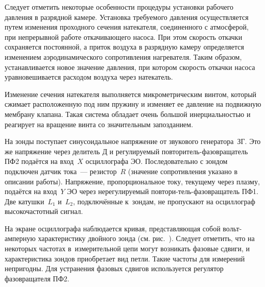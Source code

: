 Следует отметить некоторые особенности процедуры установки рабочего давления в
разрядной камере. Установка требуемого давления осуществляется путем изменения
проходного сечения натекателя, соединенного с атмосферой, при непрерывной работе
откачивающего насоса. При этом скорость откачки сохраняется постоянной, а приток
воздуха в разрядную камеру определяется изменением аэродинамического
сопротивления нагревателя. Таким образом, устанавливается новое значение
давления, при котором скорость откачки насоса уравновешивается расходом воздуха
через натекатель.

Изменение сечения натекателя выполняется микрометрическим винтом, который
сжимает расположенную под ним пружину и изменяет ее давление на подвижную
мембрану клапана. Такая система обладает очень большой инерциальностью и
реагирует на вращение винта со значительным запозданием.

На зонды поступает синусоидальное напряжение от звукового генератора~ЗГ.
Это же напряжение через делитель Д и регулируемый повторитель-фазовращатель ПФ2
подаётся на вход~$X$ осциллографа ЭО. Последовательно с зондом подключен датчик
тока~--- резистор~$R$ (значение сопротивления указано в описании работы).
Напряжение, пропорциональное току, текущему через плазму, подаётся на вход~$Y$
ЭО через нерегулируемый повтори-тель-фазовращатель ПФ1. Две катушки~$L_{1}$
и~$L_{2}$, подключённые к~зондам, не пропускают на осциллограф высокочастотный
сигнал.

На экране осциллографа наблюдается кривая, представляющая собой вольт-амперную
характеристику двойного зонда (см. рис.~).
Следует отметить, что на некоторых частотах в~измерительной цепи могут возникать
фазовые сдвиги, и характеристика зондов приобретает вид петли. Такие частоты
для измерений непригодны. Для устранения фазовых сдвигов используется регулятор
фазовращателя ПФ2.



